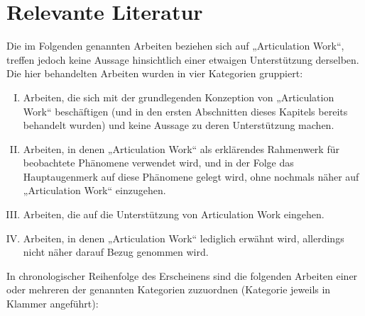 
\section{Relevante Literatur} %
\label{sec:relevante_literatur}

Die im Folgenden genannten Arbeiten beziehen sich auf „Articulation Work“, treffen jedoch keine Aussage hinsichtlich einer etwaigen Unterstützung derselben. Die hier behandelten Arbeiten wurden in vier Kategorien gruppiert:
\begin{enumerate}[(I)]
	\item Arbeiten, die sich mit der grundlegenden Konzeption von „Articulation Work“ beschäftigen (und in den ersten Abschnitten dieses Kapitels bereits behandelt wurden) und keine Aussage zu deren Unterstützung machen.
	\item Arbeiten, in denen „Articulation Work“ als erklärendes Rahmenwerk für beobachtete Phänomene verwendet wird, und in der Folge das Hauptaugenmerk auf diese Phänomene gelegt wird, ohne nochmals näher auf „Articulation Work“ einzugehen.
	\item Arbeiten, die auf die Unterstützung von Articulation Work eingehen.
	\item Arbeiten, in denen „Articulation Work“ lediglich erwähnt wird, allerdings nicht näher darauf Bezug genommen wird.
\end{enumerate}

In chronologischer Reihenfolge des Erscheinens sind die folgenden Arbeiten einer oder mehreren der genannten Kategorien zuzuordnen (Kategorie jeweils in Klammer angeführt):

